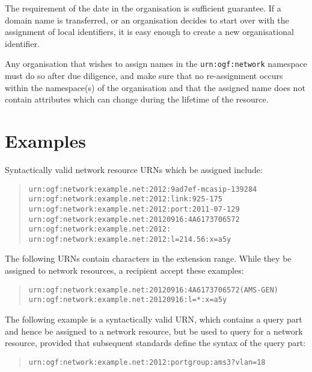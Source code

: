 \documentclass[12pt]{article}  %
\begin{document}
The requirement of the date in the organisation is sufficient guarantee.
If a domain name is transferred, or an organisation decides to start over 
with the assignment of local identifiers, it is easy enough to create a 
new organisational identifier.

Any organisation that wishes to assign names in the \texttt{urn:ogf:network} 
namespace must do so after due diligence, and make sure that no 
re-assignment occurs within the namespace(s) of the organisation and 
that the assigned name does not contain attributes which can change 
during the lifetime of the resource.

\section{Examples}

Syntactically valid network resource URNs which \MAY{} be assigned include:
\begin{quote}
\texttt{urn:ogf:network:example.net:2012:9ad7ef-mcasip-139284} \\
\texttt{urn:ogf:network:example.net:2012:link:925-175} \\
\texttt{urn:ogf:network:example.net:2012:port:2011-07-129} \\
\texttt{urn:ogf:network:example.net:20120916:4A6173706572} \\
\texttt{urn:ogf:network:example.net:2012:} \\
\texttt{urn:ogf:network:example.net:2012:l=214.56:x=a5y}
\end{quote}

The following URNs contain characters in the extension range. While they \SHOULDNOT{} be assigned to network resources, a recipient \SHOULD{} accept these examples:
\begin{quote}
\texttt{urn:ogf:network:example.net:20120916:4A6173706572(AMS-GEN)} \\
\texttt{urn:ogf:network:example.net:20120916:l=*:x=a5y} \\
\end{quote}
 
The following example is a syntactically valid URN, which contains a query 
part and hence \MUSTNOT{} be assigned to a network resource, but \MAY{} 
be used to query for a network resource, provided that subsequent standards 
define the syntax of the query part:
\begin{quote}
\texttt{urn:ogf:network:example.net:2012:portgroup:ams3?vlan=18}
\end{quote}
\end{document}
